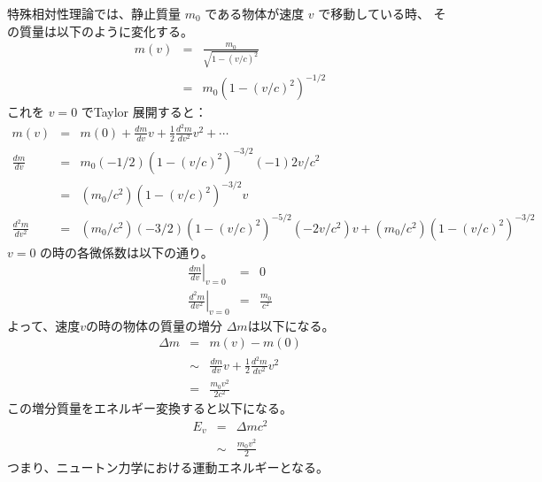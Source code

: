 特殊相対性理論では、静止質量 $m_0$ である物体が速度 $v$ で移動している時、
その質量は以下のように変化する。
  \begin{eqnarray}
    m(v) & = & \frac{m_0}{\sqrt{1 - (v/c)^2}}
  \\
         & = & m_0 (1 - (v/c)^2)^{-1/2}
  \end{eqnarray}
これを $v=0$ でTaylor 展開すると：
  \begin{eqnarray}
    m(v) & = & m(0) + \frac{d m}{d v} v + \frac{1}{2} \frac{d^2 m}{d v^2} v^2
               + \cdots
  \\
    \frac{d m}{d v} & = &
       m_0 (-1/2) (1-(v/c)^2)^{-3/2} (-1) 2v/c^2
  \\                & = &
       (m_0/c^2)(1-(v/c)^2)^{-3/2} v
  \\
    \frac{d^2 m}{d v^2} & = &
       (m_0/c^2)(-3/2)(1-(v/c)^2)^{-5/2} (-2v/c^2) v
       + (m_0/c^2)(1-(v/c)^2)^{-3/2}
  \end{eqnarray}
$v=0$ の時の各微係数は以下の通り。
  \begin{eqnarray}
    \left.\frac{d m}{d v}\right|_{v=0} & = &
       0
  \\
    \left.\frac{d^2 m}{d v^2}\right|_{v=0} & = &
       \frac{m_0}{c^2}
  \end{eqnarray}
よって、速度$v$の時の物体の質量の増分 $\Delta m$は以下になる。
  \begin{eqnarray}
    \Delta m & = & m(v) - m(0)
  \\
      & \sim &
        \frac{d m}{d v} v
        +
        \frac{1}{2} \frac{d^2 m}{d v^2} v^2
  \\
      & = &
        \frac{m_0 v^2}{2 c^2}
  \end{eqnarray}
この増分質量をエネルギー変換すると以下になる。
  \begin{eqnarray}
    E_v & = &
      \Delta m c^2
  \\
      & \sim &
        \frac{m_0 v^2}{2}
  \end{eqnarray}
つまり、ニュートン力学における運動エネルギーとなる。

